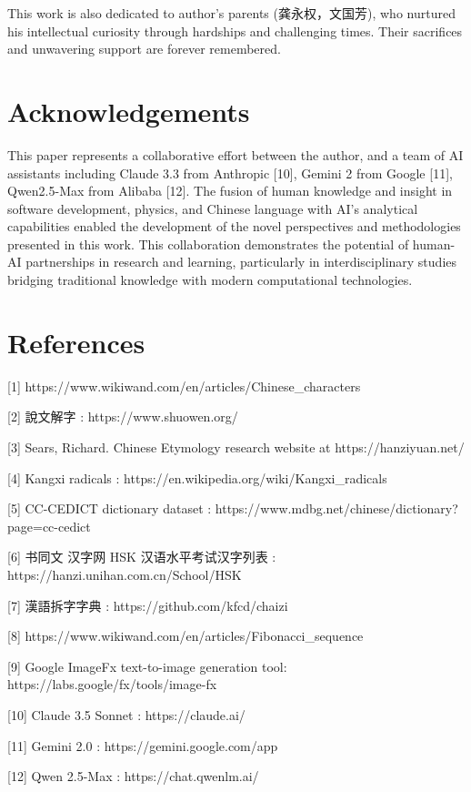 \documentclass[11pt,letterpaper]{article}
\begin{document}
This work is also dedicated to author's parents (龚永权，文国芳), who
nurtured his intellectual curiosity through hardships and challenging
times. Their sacrifices and unwavering support are forever remembered.

\section{Acknowledgements}\label{acknowledgements}

This paper represents a collaborative effort between the author, and a
team of AI assistants including Claude 3.3 from Anthropic {[}10{]},
Gemini 2 from Google {[}11{]}, Qwen2.5-Max from Alibaba {[}12{]}. The
fusion of human knowledge and insight in software development, physics,
and Chinese language with AI's analytical capabilities enabled the
development of the novel perspectives and methodologies presented in
this work. This collaboration demonstrates the potential of human-AI
partnerships in research and learning, particularly in interdisciplinary
studies bridging traditional knowledge with modern computational
technologies.

\section{References}\label{references}

{[}1{]} https://www.wikiwand.com/en/articles/Chinese\_characters

{[}2{]} 說文解字 : https://www.shuowen.org/

{[}3{]} Sears, Richard. Chinese Etymology research website at
https://hanziyuan.net/

{[}4{]} Kangxi radicals : https://en.wikipedia.org/wiki/Kangxi\_radicals

{[}5{]} CC-CEDICT dictionary dataset :
https://www.mdbg.net/chinese/dictionary?page=cc-cedict

{[}6{]} 书同文 汉字网 HSK 汉语水平考试汉字列表 :
https://hanzi.unihan.com.cn/School/HSK

{[}7{]} 漢語拆字字典 : https://github.com/kfcd/chaizi

{[}8{]} https://www.wikiwand.com/en/articles/Fibonacci\_sequence

{[}9{]} Google ImageFx text-to-image generation tool:
https://labs.google/fx/tools/image-fx

{[}10{]} Claude 3.5 Sonnet : https://claude.ai/

{[}11{]} Gemini 2.0 : https://gemini.google.com/app

{[}12{]} Qwen 2.5-Max : https://chat.qwenlm.ai/
\end{document}

